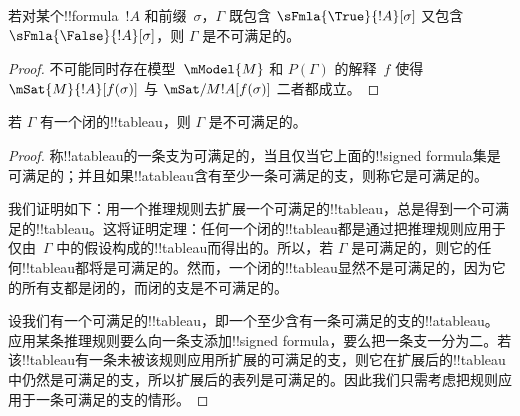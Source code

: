 \documentclass[../../../include/open-logic-section]{subfiles}
\begin{document}
\begin{prop}
  若对某个!!{formula}~$!A$ 和前缀~$\sigma$，$\Gamma$ 既包含 $\sFmla{\True}{!A}[\sigma]$ 又包含 $\sFmla{\False}{!A}[\sigma]$，则 $\Gamma$ 是不可满足的。
\end{prop}

\begin{proof}
  不可能同时存在模型~$\mModel{M}$ 和 $P(\Gamma)$ 的解释~$f$ 使得 $\mSat{M}{!A}[f(\sigma)]$ 与 $\mSat/{M}{!A}[f(\sigma)]$ 二者都成立。
\end{proof}

\begin{thm}[可靠性]
  若 $\Gamma$ 有一个闭的!!{tableau}，则 $\Gamma$ 是不可满足的。
\end{thm}

\begin{proof}
称!!a{tableau}的一条支为可满足的，当且仅当它上面的!!{signed formula}集是可满足的；并且如果!!a{tableau}含有至少一条可满足的支，则称它是可满足的。

我们证明如下：用一个推理规则去扩展一个可满足的!!{tableau}，总是得到一个可满足的!!{tableau}。这将证明定理：任何一个闭的!!{tableau}都是通过把推理规则应用于仅由~$\Gamma$ 中的假设构成的!!{tableau}而得出的。所以，若 $\Gamma$ 是可满足的，则它的任何!!{tableau}都将是可满足的。然而，一个闭的!!{tableau}显然不是可满足的，因为它的所有支都是闭的，而闭的支是不可满足的。

设我们有一个可满足的!!{tableau}，即一个至少含有一条可满足的支的!!a{tableau}。应用某条推理规则要么向一条支添加!!{signed formula}，要么把一条支一分为二。若该!!{tableau}有一条未被该规则应用所扩展的可满足的支，则它在扩展后的!!{tableau}中仍然是可满足的支，所以扩展后的表列是可满足的。因此我们只需考虑把规则应用于一条可满足的支的情形。


\end{proof}
\end{document}

